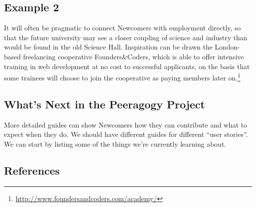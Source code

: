 \hypertarget{example-2}{%
\subsection{Example 2}\label{example-2}}

It will often be pragmatic to connect {{Newcomers}} with employment
directly, so that the future university may see a closer coupling of
science and industry than would be found in the old Science Hall.
Inspiration can be drawn the London-based freelancing cooperative
Founders\&Coders, which is able to offer intensive training in web
development at no cost to successful applicants, on the basis that some
trainees will choose to join the cooperative as paying members later
on.\footnote{\url{http://www.foundersandcoders.com/academy/}}

\hypertarget{whats-next-in-the-peeragogy-project}{%
\subsection{What's Next in the Peeragogy
Project}\label{whats-next-in-the-peeragogy-project}}

More detailed guides can show {{Newcomers}} how they can contribute and
what to expect when they do. We should have different guides for
different ``user stories''. We can start by listing some of the things
we're currently learning about.

\hypertarget{references}{%
\subsection{References}\label{references}}


